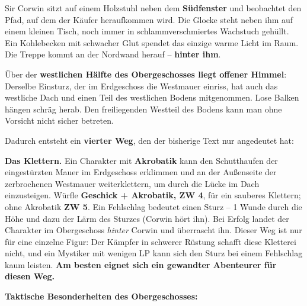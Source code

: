 \documentclass[10pt,a4paper]{article}
\begin{document}
Sir Corwin sitzt auf einem Holzstuhl neben dem \textbf{Südfenster} und beobachtet den Pfad, auf dem der Käufer heraufkommen wird. Die Glocke steht neben ihm auf einem kleinen Tisch, noch immer in schlammverschmiertes Wachstuch gehüllt. Ein Kohlebecken mit schwacher Glut spendet das einzige warme Licht im Raum. Die Treppe kommt an der Nordwand herauf -- \textbf{hinter ihm}.

Über der \textbf{westlichen Hälfte des Obergeschosses liegt offener Himmel}: Derselbe Einsturz, der im Erdgeschoss die Westmauer einriss, hat auch das westliche Dach und einen Teil des westlichen Bodens mitgenommen. Lose Balken hängen schräg herab. Den freiliegenden Westteil des Bodens kann man ohne Vorsicht nicht sicher betreten.

Dadurch entsteht ein \textbf{vierter Weg}, den der bisherige Text nur angedeutet hat:

\textbf{Das Klettern.} Ein Charakter mit \textbf{Akrobatik} kann den Schutthaufen der eingestürzten Mauer im Erdgeschoss erklimmen und an der Außenseite der zerbrochenen Westmauer weiterklettern, um durch die Lücke im Dach einzusteigen. Würfle \textbf{Geschick + Akrobatik, ZW 4}, für ein sauberes Klettern; ohne Akrobatik \textbf{ZW 5}. Ein Fehlschlag bedeutet einen Sturz -- 1 Wunde durch die Höhe und dazu der Lärm des Sturzes (Corwin hört ihn). Bei Erfolg landet der Charakter im Obergeschoss \emph{hinter} Corwin und überrascht ihn. Dieser Weg ist nur für eine einzelne Figur: Der Kämpfer in schwerer Rüstung schafft diese Kletterei nicht, und ein Mystiker mit wenigen LP kann sich den Sturz bei einem Fehlschlag kaum leisten. \textbf{Am besten eignet sich ein gewandter Abenteurer für diesen Weg.}

\par{}\noindent\textbf{Taktische Besonderheiten des Obergeschosses:}
\end{document}
